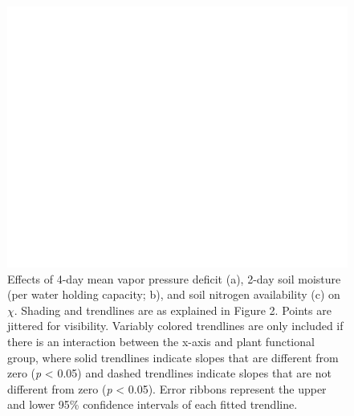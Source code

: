 \newpage
\begin{figure}
    \centering
    \includegraphics[scale = 0.2]{ch4_TXeco/figs/TXeco_fig3_chi.png}
    \caption[Effects of 4-day mean vapor pressure deficit, 2-day soil moisture (per water holding capacity), and soil nitrogen availability on $\chi$. ]{Effects of 4-day mean vapor pressure deficit (a), 2-day soil moisture (per water holding capacity; b), and soil nitrogen availability (c) on $\chi$. Shading and trendlines are as explained in Figure 2. Points are jittered for visibility. Variably colored trendlines are only included if there is an interaction between the x-axis and plant functional group, where solid trendlines indicate slopes that are different from zero (\textit{p} < 0.05) and dashed trendlines indicate slopes that are not different from zero (\textit{p} < 0.05). Error ribbons represent the upper and lower 95\% confidence intervals of each fitted trendline.}
    \label{fig:figure4.3}
\end{figure}
\clearpage

